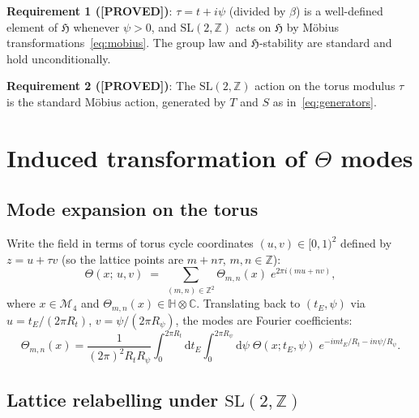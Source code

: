 \documentclass[12pt,a4paper]{article}
\theoremstyle{definition}
\theoremstyle{remark}
\newcommand{\PROVED}{\textcolor{green!50!black}{\textbf{[PROVED]}}}
\newcommand{\SL}{\mathrm{SL}}
\newcommand{\ZZ}{\mathbb{Z}}
\newcommand{\HH}{\mathfrak{H}}
\newcommand{\CC}{\mathbb{C}}
\newcommand{\dd}{\mathrm{d}}
\begin{document}
\begin{resultbox}
\textbf{Requirement 1 (\PROVED)}: $\tau=t+i\psi$ (divided by $\beta$) is a
well-defined element of $\HH$ whenever $\psi>0$, and $\SL(2,\ZZ)$ acts on
$\HH$ by Möbius transformations~\eqref{eq:mobius}.  The group law and
$\HH$-stability are standard and hold unconditionally.

\medskip\noindent
\textbf{Requirement 2 (\PROVED)}: The $\SL(2,\ZZ)$ action on the torus
modulus $\tau$ is the standard Möbius action, generated by $T$ and $S$ as
in~\eqref{eq:generators}.
\end{resultbox}

\section{Induced transformation of $\Theta$ modes}
\label{sec:modes}

\subsection{Mode expansion on the torus}

Write the field in terms of torus cycle coordinates $(u,v)\in[0,1)^2$
defined by $z = u + \tau v$ (so the lattice points are $m + n\tau$,
$m,n\in\ZZ$):
\begin{equation}
  \Theta(x;\,u,v)
  \;=\;
  \sum_{(m,n)\in\ZZ^2}
  \Theta_{m,n}(x)\;
  e^{2\pi i(mu+nv)},
  \label{eq:mode-expansion}
\end{equation}
where $x\in\mathcal M_4$ and $\Theta_{m,n}(x)\in\mathbb{H}\otimes\CC$.
Translating back to $(t_E,\psi)$ via $u=t_E/(2\pi R_t)$,
$v=\psi/(2\pi R_\psi)$, the modes are Fourier coefficients:
\begin{equation}
  \Theta_{m,n}(x)
  = \frac{1}{(2\pi)^2 R_t R_\psi}
    \int_0^{2\pi R_t}\!\dd t_E
    \int_0^{2\pi R_\psi}\!\dd\psi\;
    \Theta(x;t_E,\psi)\;
    e^{-im t_E/R_t - in\psi/R_\psi}.
\end{equation}

\subsection{Lattice relabelling under $\SL(2,\ZZ)$}
\end{document}
